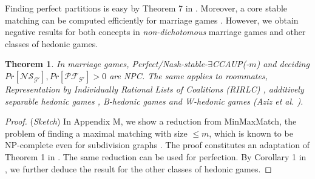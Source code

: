 \documentclass[letterpaper]{article} %
\newtheorem{theorem}{Theorem}
\begin{document}
Finding perfect partitions is easy by Theorem 7 in \cite{aziz2013pareto}. Moreover, a core stable matching can be computed efficiently for marriage games \cite{gale1962college}. However, we obtain negative results for both concepts in \textit{non-dichotomous} marriage games and other classes of hedonic games.
\begin{theorem}
\label{theorem:nash-stable-marriage}
In marriage games, Perfect/Nash-stable-$\exists$CCAUP(-$m$) and deciding $Pr[\mathcal{NS}_{\mathcal{G}'}], Pr[\mathcal{PF}_{\mathcal{G}'}] > 0$ are NPC. The same applies to {\normalfont roommates}, {\normalfont Representation by Individually Rational Lists of Coalitions (RIRLC)} \cite{ballester2004np}, {\normalfont additively separable hedonic games} \cite{olsen2009nash}, {\normalfont B-hedonic games} and {\normalfont W-hedonic games} (Aziz et al. ).
\end{theorem}
\begin{proof}
(\textit{Sketch}) In Appendix M, we show a reduction from MinMaxMatch, the problem of finding a maximal matching with size $\leq m$, which is known to be NP-complete even for subdivision graphs \cite{horton1993minimum}. The proof constitutes an adaptation of Theorem 1 in \cite{aziz2013stable}. The same reduction can be used for perfection. %
By Corollary 1 in \cite{aziz2013stable}, we further deduce the result for the other classes of hedonic games. 
\end{proof}
\end{document}
